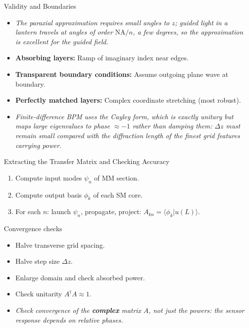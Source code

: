 \documentclass[aspectratio=169,10pt]{beamer}
\begin{document}
\begin{frame}{Validity and Boundaries}
\begin{itemize}
    \item \emph{The paraxial approximation requires small angles to $z$; guided light in a lantern travels at angles of order $\mathrm{NA}/n$, a few degrees, so the approximation is excellent for the guided field.}
    \item \textbf{Absorbing layers:} Ramp of imaginary index near edges.
    \item \textbf{Transparent boundary conditions:} Assume outgoing plane wave at boundary.
    \item \textbf{Perfectly matched layers:} Complex coordinate stretching (most robust).
    \item \emph{Finite-difference BPM uses the Cayley form, which is exactly unitary but maps large eigenvalues to phase $\approx -1$ rather than damping them: $\Delta z$ must remain small compared with the diffraction length of the finest grid features carrying power.}
\end{itemize}
\end{frame}

\begin{frame}{Extracting the Transfer Matrix and Checking Accuracy}
\begin{enumerate}
    \item Compute input modes \(\psi_n\) of MM section.
    \item Compute output basis \(\phi_k\) of each SM core.
    \item For each \(n\): launch \(\psi_n\), propagate, project: \(A_{kn} = \langle \phi_k | u(L) \rangle\).
\end{enumerate}
\begin{block}{Convergence checks}
\begin{itemize}
    \item Halve transverse grid spacing.
    \item Halve step size \(\Delta z\).
    \item Enlarge domain and check absorbed power.
    \item Check unitarity \(A^\dagger A \approx 1\).
    \item \emph{Check convergence of the \textbf{complex} matrix \(A\), not just the powers: the sensor response depends on relative phases.}
\end{itemize}
\end{block}
\end{frame}
\end{document}
